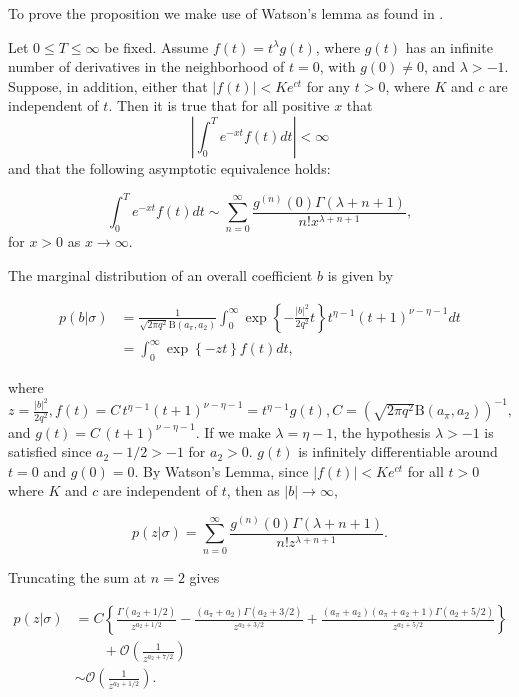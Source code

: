 To prove the proposition we make use of Watson's lemma as found in \cite{appliedasymptotic}.

\begin{lemma}
Let $0\leq T \leq \infty$ be fixed. Assume $f(t)= t^{\lambda} g(t)$, where $g(t)$ has an infinite number of derivatives in the neighborhood of $t=0$, with $g(0)\neq 0$, and $\lambda > -1$. Suppose, in addition, either that $ |f(t)| < K e^{ct}$ for any $t>0$, where $K$ and $c$ are independent of $t$. Then it is true that for all positive $x$ that
\[  \left| \int_0^T e^{-xt} f(t) dt \right| <\infty  \]
and that the following asymptotic equivalence holds:

\[	\int_0^T e^{-xt} f(t) dt  \sim \sum_{n=0}^\infty \frac{ g^{(n)}(0) \Gamma \left( \lambda+n+1 \right) }{n! x^{\lambda+n+1 }}	,\]
for $x>0$ as $x\to \infty$. \\
\end{lemma}

The marginal distribution of an overall coefficient $b$ is given by

\begin{align*}
    p(b|\sigma)&= \frac{1}{\sqrt{2\pi q^2} \text{B}(a_\pi, a_2) } \int_{0}^\infty \exp \left\lbrace  -\frac{|b|^2}{2q^2} t \right\rbrace t^{\eta-1} (t+1)^{\nu-\eta-1}  dt \\   &= \int_0^\infty \exp \left\lbrace  -z t  \right\rbrace f(t) dt ,
\end{align*}


where $ z=\frac{|b|^2}{2q^2},f(t)= C \, t^{\eta-1} (t+1)^{\nu-\eta-1} = t^{\eta-1} g(t), C=  \left(\sqrt{2\pi q^2} \text{B}(a_\pi, a_2) \right)^{-1},$ and $g(t)=C \,(t+1)^{\nu-\eta-1}$.  If we make $\lambda=\eta-1$, the hypothesis $\lambda >-1$ is satisfied since $a_2-1/2 > -1$ for $a_2>0$. $g(t)$ is infinitely differentiable around $t=0$ and $g(0)=0$. By Watson's Lemma, since $|f(t)|< K e^{ct}$ for all $t>0$ where $K$ and $c$ are independent of $t$, then as $|b| \to \infty,$

\[  p(z|\sigma)= \sum_{n=0}^\infty  \frac{g^{(n)}(0) \Gamma(\lambda+n+1)}{n! z^{\lambda+n+1}}.         \]

Truncating the sum at $n=2$ gives

\begin{align*}
    p(z|\sigma)&= C\left\lbrace \frac{ \Gamma(a_2+1/2)}{z^{a_2+1/2}} -
    \frac{ (a_\pi+a_2) \Gamma(a_2+3/2)}{z^{a_2+3/2}}+
    \frac{ (a_\pi+a_2) (a_\pi+a_2+1) \Gamma(a_2+5/2)}{z^{a_2+5/2}}  \right\rbrace  \\
    &\qquad + \mathcal{O}\left(  \frac{1}{ z^{a_2+7/2}}\right) \\
    &\sim \mathcal{O} \left(  \frac{1}{ z^{a_2+1/2}}\right).
\end{align*}

